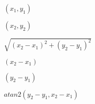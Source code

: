 \documentclass{article}
\begin{document}
$(x_1,y_1)$
\pagebreak

$(x_2,y_2)$
\pagebreak

$\sqrt{(x_2-x_1)^2+(y_2-y_1)^2}$
\pagebreak

$(x_2-x_1)$
\pagebreak

$(y_2-y_1)$
\pagebreak

$atan2(y_2 - y_1,x_2 - x_1)$
\pagebreak
\end{document}
